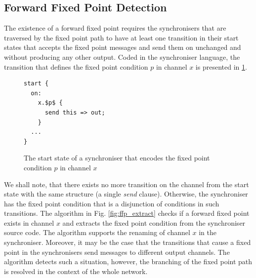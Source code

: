 
    \subsection{Forward Fixed Point Detection}
The existence of a forward fixed point requires the synchronisers that are traversed by the fixed point path to have at least one transition in their start states that accepts the fixed point messages and send them on unchanged and without producing any other output. Coded in the synchroniser language, the transition that defines the fixed point condition $p$ in channel $x$ is presented in \ref{ffp:synch_fp}.
\begin{figure}[h!]
\begin{lstlisting}[frame=single,mathescape]
start {
  on:
    x.$p$ {
      send this => out;
    }
  ...
}
\end{lstlisting}
\caption{The start state of a synchroniser that encodes the fixed point condition $p$ in channel $x$}
\label{ffp:synch_fp}
\end{figure}

We shall note, that there exists no more transition on the channel from the start state with the same structure (a single \emph{send} clause). Otherwise, the synchroniser has the fixed point condition that is a disjunction of conditions in such transitions. The algorithm in Fig. \ref{fig:ffp_extract} checks if a forward fixed point exists in channel $x$ and extracts the fixed point condition from the synchroniser source code. The algorithm supports the renaming of channel $x$ in the synchroniser. Moreover, it may be the case that the transitions that cause a fixed point in the synchronisers send messages to different output channels. The algorithm detects such a situation, however, the branching of the fixed point path is resolved in the context of the whole network.

